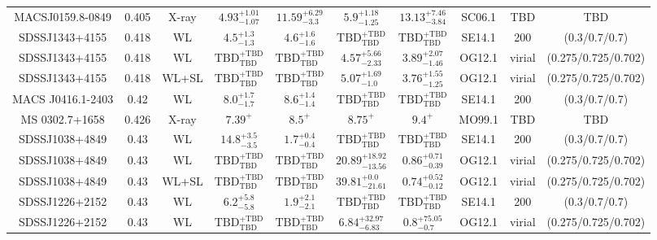 \begin{table}
\begin{tabular}{cccccccccc}
MACSJ0159.8-0849 & 0.405 & X-ray & ${4.93}^{+1.01}_{-1.07}$ & ${11.59}^{+6.29}_{-3.3}$ & ${5.9}^{+1.18}_{-1.25}$ & ${13.13}^{+7.46}_{-3.84}$ & SC06.1 & TBD & TBD \\
SDSSJ1343+4155 & 0.418 & WL & ${4.5}^{+1.3}_{-1.3}$ & ${4.6}^{+1.6}_{-1.6}$ & ${\mathrm{TBD}}^{+\mathrm{TBD}}_{\mathrm{TBD}}$ & ${\mathrm{TBD}}^{+\mathrm{TBD}}_{\mathrm{TBD}}$ & SE14.1 & 200 & (0.3/0.7/0.7) \\
SDSSJ1343+4155 & 0.418 & WL & ${\mathrm{TBD}}^{+\mathrm{TBD}}_{\mathrm{TBD}}$ & ${\mathrm{TBD}}^{+\mathrm{TBD}}_{\mathrm{TBD}}$ & ${4.57}^{+5.66}_{-2.33}$ & ${3.89}^{+2.07}_{-1.46}$ & OG12.1 & virial & (0.275/0.725/0.702) \\
SDSSJ1343+4155 & 0.418 & WL+SL & ${\mathrm{TBD}}^{+\mathrm{TBD}}_{\mathrm{TBD}}$ & ${\mathrm{TBD}}^{+\mathrm{TBD}}_{\mathrm{TBD}}$ & ${5.07}^{+1.69}_{-1.0}$ & ${3.76}^{+1.55}_{-1.25}$ & OG12.1 & virial & (0.275/0.725/0.702) \\
MACS J0416.1-2403 & 0.42 & WL & ${8.0}^{+1.7}_{-1.7}$ & ${8.6}^{+1.4}_{-1.4}$ & ${\mathrm{TBD}}^{+\mathrm{TBD}}_{\mathrm{TBD}}$ & ${\mathrm{TBD}}^{+\mathrm{TBD}}_{\mathrm{TBD}}$ & SE14.1 & 200 & (0.3/0.7/0.7) \\
MS 0302.7+1658 & 0.426 & X-ray & ${7.39}^{+}_{}$ & ${8.5}^{+}_{}$ & ${8.75}^{+}_{}$ & ${9.4}^{+}_{}$ & MO99.1 & TBD & TBD \\
SDSSJ1038+4849 & 0.43 & WL & ${14.8}^{+3.5}_{-3.5}$ & ${1.7}^{+0.4}_{-0.4}$ & ${\mathrm{TBD}}^{+\mathrm{TBD}}_{\mathrm{TBD}}$ & ${\mathrm{TBD}}^{+\mathrm{TBD}}_{\mathrm{TBD}}$ & SE14.1 & 200 & (0.3/0.7/0.7) \\
SDSSJ1038+4849 & 0.43 & WL & ${\mathrm{TBD}}^{+\mathrm{TBD}}_{\mathrm{TBD}}$ & ${\mathrm{TBD}}^{+\mathrm{TBD}}_{\mathrm{TBD}}$ & ${20.89}^{+18.92}_{-13.56}$ & ${0.86}^{+0.71}_{-0.39}$ & OG12.1 & virial & (0.275/0.725/0.702) \\
SDSSJ1038+4849 & 0.43 & WL+SL & ${\mathrm{TBD}}^{+\mathrm{TBD}}_{\mathrm{TBD}}$ & ${\mathrm{TBD}}^{+\mathrm{TBD}}_{\mathrm{TBD}}$ & ${39.81}^{+0.0}_{-21.61}$ & ${0.74}^{+0.52}_{-0.12}$ & OG12.1 & virial & (0.275/0.725/0.702) \\
SDSSJ1226+2152 & 0.43 & WL & ${6.2}^{+5.8}_{-5.8}$ & ${1.9}^{+2.1}_{-2.1}$ & ${\mathrm{TBD}}^{+\mathrm{TBD}}_{\mathrm{TBD}}$ & ${\mathrm{TBD}}^{+\mathrm{TBD}}_{\mathrm{TBD}}$ & SE14.1 & 200 & (0.3/0.7/0.7) \\
SDSSJ1226+2152 & 0.43 & WL & ${\mathrm{TBD}}^{+\mathrm{TBD}}_{\mathrm{TBD}}$ & ${\mathrm{TBD}}^{+\mathrm{TBD}}_{\mathrm{TBD}}$ & ${6.84}^{+32.97}_{-6.83}$ & ${0.8}^{+75.05}_{-0.7}$ & OG12.1 & virial & (0.275/0.725/0.702) \\

\end{tabular}
\end{table}
